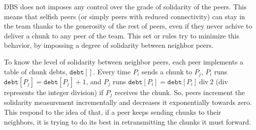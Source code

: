 
\begin{comment}
Notice that in this example, for the sake of simplicity, a simple
round-robing pending scheduler has been used.  Actually, DBS selects
the $\mathtt{pending}[]$ entries using the supportivity information
gathered from the neighbors. This information is stored in a
$\mathtt{supportivity}[]$ table, which is indexed by the neighbors
end-points. When the list of peers is received from the splitter, all
the peers have the same supportivity. These supportivity values are
incremented each time a chunk is received from the corresponding
neighbor and decremented each time a chunk is received form the
splitter (i.e., in each round). Thus, supportive neighbors will tend
to have a higher supportivity than unsupportive neighbors.
\end{comment}

DBS does not imposes any control over the grade of solidarity of the
peers. This means that selfish peers (or simply peers with reduced
connectivity) can stay in the team thanks to the generosity of the
rest of peers, even if they never achive to deliver a chunk to any
peer of the team. This set or rules try to minimize this behavior,
by impossing a degree of solidarity between neighbor peers.

To know the level of solidarity between neighbor peers, each peer
implements a table of chunk debts, $\mathtt{debt}[]$. Every time $P_i$
sends a chunk to $P_j$, $P_i$ runs $\mathtt{debt}[P_j] =
\mathtt{debt}[P_j]+1$, and $P_j$ runs $\mathtt{debt}[P_i] =
\mathtt{debt}[P_i]~\text{div}~2$ ($\text{div}$ represents the integer
division) if $P_j$ receives the chunk. So, peers increment the
solidarity measurement incrementally and decreases it exponentially
towards zero. This respond to the idea of that, if a peer keeps
sending chunks to their neighbors, it is trying to do its best in
retransmitting the chunks it must forward.

